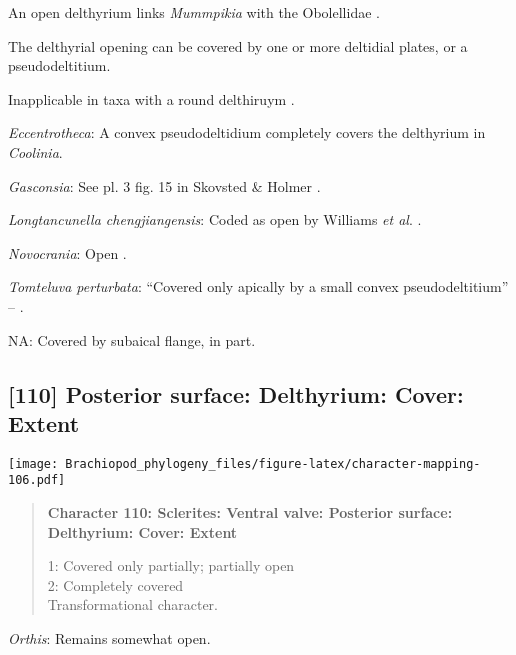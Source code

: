 \documentclass[openany]{book}
\theoremstyle{definition}
\theoremstyle{definition}
\theoremstyle{definition}
\theoremstyle{remark}
\begin{document}
An open delthyrium links \emph{Mummpikia} with the Obolellidae
\citep{Balthasar2008iMummpikia}.

The delthyrial opening can be covered by one or more deltidial plates,
or a pseudodeltitium.

Inapplicable in taxa with a round delthiruym \citep[generated by
overgrowth of the delthyrial opening by posterolateral parts of the
shell, per][]{Popov1992TheCambrian}.

\hypertarget{Eccentrotheca-coding-109}{}
\emph{Eccentrotheca}: A convex pseudodeltidium completely covers the
delthyrium in \emph{Coolinia}.

\hypertarget{Gasconsia-coding-109}{}
\emph{Gasconsia}: See pl. 3 fig. 15 in Skovsted \& Holmer
\citeyearpar{Skovsted2005EarlyCambrian}.

\hypertarget{Longtancunella_chengjiangensis-coding-109}{}
\emph{Longtancunella chengjiangensis}: Coded as open by Williams
\emph{et al}. \citeyearpar{Williams1998Thediversity}.

\hypertarget{Novocrania-coding-109}{}
\emph{Novocrania}: Open \citep{Topper2013Theoldest}.

\hypertarget{Tomteluva_perturbata-coding-109}{}
\emph{Tomteluva perturbata}: ``Covered only apically by a small convex
pseudodeltitium'' -- \citet{Holmer2018Evolutionarysignificance}.

\hypertarget{NA-coding-109}{}
NA: Covered by subaical flange, in part.

\subsection*{{[}110{]} Posterior surface: Delthyrium: Cover:
Extent}\label{posterior-surface-delthyrium-cover-extent}

\texttt{[image: Brachiopod\_phylogeny\_files/figure-latex/character-mapping-106.pdf]}

\begin{quote}
\textbf{Character 110: Sclerites: Ventral valve: Posterior surface:
Delthyrium: Cover: Extent}

1: Covered only partially; partially open\\
2: Completely covered\\
Transformational character.
\end{quote}

\hypertarget{Orthis-coding-110}{}
\emph{Orthis}: Remains somewhat open.
\end{document}
